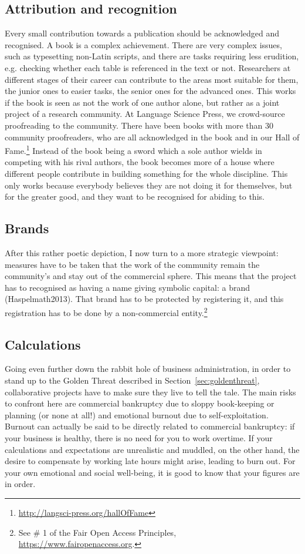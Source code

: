\documentclass[12pt]{article}
\newcommand{\citep}[1]{(#1)}
\begin{document}
\subsection{Attribution and recognition}
Every small contribution towards a publication should be acknowledged and recognised. A book is a complex achievement. There are very complex issues, such as typesetting non-Latin scripts, and there are tasks requiring less erudition, e.g. checking whether each table is referenced in the text or not. Researchers at different stages of their career can contribute to the areas most suitable for them, the junior ones to easier tasks, the senior ones for the advanced ones. This works if the book is seen as not the work of one author alone, but rather as a joint project of a research community. At Language Science Press, we crowd-source proofreading to the community. There have been books with more than 30 community proofreaders, who are all acknowledged in the book and in our Hall of Fame.\footnote{\url{http://langsci-press.org/hallOfFame}} Instead of the book being a sword which a sole author wields in competing with his rival authors, the book becomes more of a house where different people contribute in building something for the whole discipline. This only works because everybody believes they are not doing it for themselves, but for the greater good, and they want to be recognised for abiding to this. 

\subsection{Brands}
After this rather poetic depiction, I now turn to a more strategic viewpoint: measures have to be taken that the work of the community remain the community's and stay out of the commercial sphere. This means that the project has to recognised as having a name giving symbolic capital: a brand \citep{Haspelmath2013}. That brand has to be protected by registering it, and this registration has to be done by a non-commercial entity.\footnote{See \# 1 of the Fair Open Access Principles, \url{https://www.fairopenaccess.org}.}


\subsection{Calculations}
Going even further down the rabbit hole of business administration, in order to stand up to the Golden Threat described in Section~\ref{sec:goldenthreat}, collaborative projects have to make sure they live to tell the tale. The main risks to confront here are commercial bankruptcy due to sloppy book-keeping or planning (or none at all!) and emotional burnout due to self-exploitation. Burnout can actually be said to be directly related to commercial bankruptcy: if your business is healthy, there is no need for you to work overtime. If your calculations and expectations are unrealistic and muddled, on the other hand, the desire to compensate by working late hours might arise, leading to burn out. For your own emotional and social well-being, it is good to know that your figures are in order. 
\end{document}
